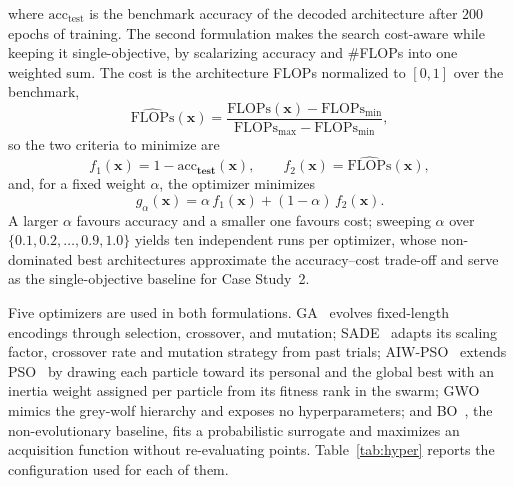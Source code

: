 \documentclass[runningheads]{llncs}
\begin{document}
where $\mathrm{acc}_{\mathrm{test}}$ is the benchmark accuracy of the decoded architecture after $200$ epochs of training. The second formulation makes the search cost-aware while keeping it single-objective, by scalarizing accuracy and \#FLOPs into one weighted sum. The cost is the architecture FLOPs normalized to $[0,1]$ over the benchmark,
\begin{equation}
\widehat{\mathrm{FLOPs}}(\mathbf{x}) = \frac{\mathrm{FLOPs}(\mathbf{x}) - \mathrm{FLOPs}_{\min}}{\mathrm{FLOPs}_{\max} - \mathrm{FLOPs}_{\min}},
\label{eq:flops}
\end{equation}
so the two criteria to minimize are
\begin{equation}
f_1(\bm{x}) = 1 - \mathrm{acc}_{\mathbf{test}}(\mathbf{x}), \qquad f_2(\mathbf{x}) = \widehat{\mathrm{FLOPs}}(\mathbf{x}),
\label{eq:objectives}
\end{equation}
and, for a fixed weight $\alpha$, the optimizer minimizes
\begin{equation}
g_\alpha(\mathbf{x}) = \alpha\, f_1(\mathbf{x}) + (1-\alpha)\, f_2(\mathbf{x}).
\label{eq:scalar}
\end{equation}
A larger $\alpha$ favours accuracy and a smaller one favours cost; sweeping $\alpha$ over $\{0.1,0.2,\dots,0.9,1.0\}$ yields ten independent runs per optimizer, whose non-dominated best architectures approximate the accuracy--cost trade-off and serve as the single-objective baseline for Case Study~2.

Five optimizers are used in both formulations. GA~\cite{goldberg1989genetic} evolves fixed-length encodings through selection, crossover, and mutation; SADE~\cite{qin2009sade} adapts its scaling factor, crossover rate and mutation strategy from past trials; AIW-PSO~\cite{qin2006aiwpso} extends PSO~\cite{kennedy1995pso} by drawing each particle toward its personal and the global best with an inertia weight assigned per particle from its fitness rank in the swarm; GWO~\cite{mirjalili2014gwo} mimics the grey-wolf hierarchy and exposes no hyperparameters; and BO~\cite{snoek2012bo}, the non-evolutionary baseline, fits a probabilistic surrogate and maximizes an acquisition function without re-evaluating points. Table~\ref{tab:hyper} reports the configuration used for each of them.

%
%
\end{document}

